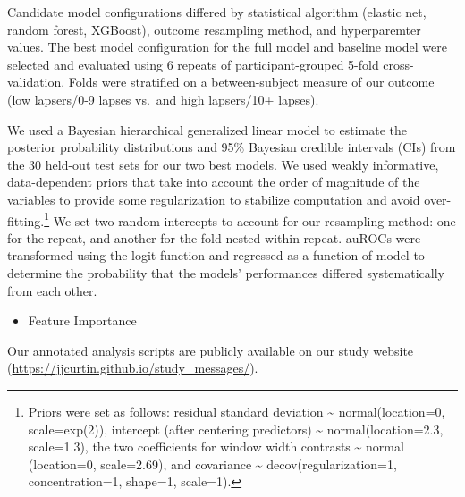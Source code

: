 \documentclass[
  letterpaper,
  DIV=11,
  numbers=noendperiod]{scrartcl}
\providecommand{\tightlist}{%
  \setlength{\itemsep}{0pt}\setlength{\parskip}{0pt}}\usepackage{longtable,booktabs,array}
\begin{document}
Candidate model configurations differed by statistical algorithm
(elastic net, random forest, XGBoost), outcome resampling method, and
hyperparemter values. The best model configuration for the full model
and baseline model were selected and evaluated using 6 repeats of
participant-grouped 5-fold cross-validation. Folds were stratified on a
between-subject measure of our outcome (low lapsers/0-9 lapses vs.~and
high lapsers/10+ lapses).

We used a Bayesian hierarchical generalized linear model to estimate the
posterior probability distributions and 95\% Bayesian credible intervals
(CIs) from the 30 held-out test sets for our two best models. We used
weakly informative, data-dependent priors that take into account the
order of magnitude of the variables to provide some regularization to
stabilize computation and avoid over-fitting.\footnote{Priors were set
  as follows: residual standard deviation \textasciitilde{}
  normal(location=0, scale=exp(2)), intercept (after centering
  predictors) \textasciitilde{} normal(location=2.3, scale=1.3), the two
  coefficients for window width contrasts \textasciitilde{} normal
  (location=0, scale=2.69), and covariance \textasciitilde{}
  decov(regularization=1, concentration=1, shape=1, scale=1).} We set
two random intercepts to account for our resampling method: one for the
repeat, and another for the fold nested within repeat. auROCs were
transformed using the logit function and regressed as a function of
model to determine the probability that the models' performances
differed systematically from each other.

\begin{itemize}
\tightlist
\item
  Feature Importance
\end{itemize}

Our annotated analysis scripts are publicly available on our study
website (\url{https://jjcurtin.github.io/study_messages/}).
\end{document}
